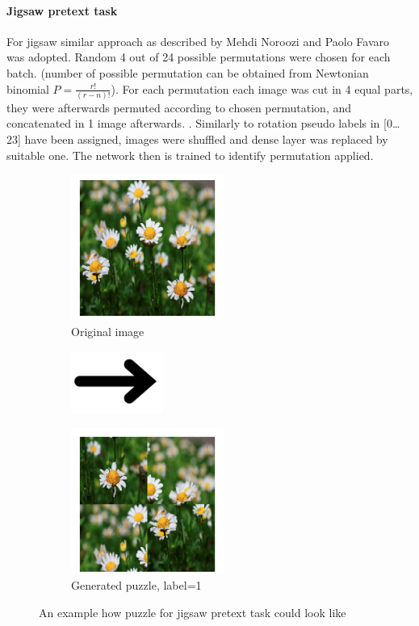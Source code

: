 \paragraph{Jigsaw pretext task}
For jigsaw similar approach as described by Mehdi Noroozi and Paolo Favaro~\cite{DBLP:journals/corr/NorooziF16} was adopted.
Random 4 out of 24 possible permutations were chosen for each batch.
(number of possible permutation can be obtained from Newtonian binomial $P=\frac{r!}{(r-n)!}$).
For each permutation each image was cut in 4 equal parts, they were afterwards permuted according to chosen permutation,
and concatenated in 1 image afterwards.
.
Similarly to rotation pseudo labels in [0\ldots23] have been assigned, images were shuffled and dense layer was replaced by suitable one.
The network then is trained to identify permutation applied.
\\
\begin{figure}[h]
    \begin{subfigure}{0.33\textwidth}
        \caption{Original image}
        \includegraphics[width=5cm]{images/dandelion}
    \end{subfigure}
    \begin{subfigure}{0.2\textwidth}
        \includegraphics[width=3cm]{images/arrow}
    \end{subfigure}
    \begin{subfigure}{0.33\textwidth}
        \caption{Generated puzzle, label=1}
        \includegraphics[width=5cm]{images/puzzle}
    \end{subfigure}
    \caption{An example how puzzle for jigsaw pretext task could look like}
\end{figure}

